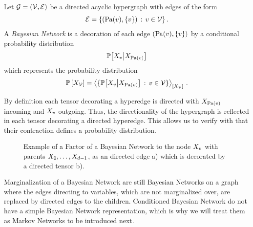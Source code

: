 \begin{definition}
    \label{def:bayesianNetwork}
    Let $\mathcal{G}=(\mathcal{V},\mathcal{E})$ be a directed acyclic hypergraph with edges of the form
    \[ \mathcal{E} = \{(\mathrm{Pa}(v),\{v\}) \,:\, v\in\mathcal{V}\} \, . \]
    A \emph{Bayesian Network} is a decoration of each edge $(\mathrm{Pa}(v),\{v\})$ by a conditional probability distribution
    \[ \mathbb{P}\big[X_{v}\big|X_{\mathrm{Pa}(v)}\big] \]
    which represents the probability distribution
    \begin{align*}
        \mathbb{P}\left[X_{\mathcal{V}}\right] = \left\langle \{\mathbb{P}\big[X_{v}\big|X_{\mathrm{Pa}(v)}\big] \,:\,v\in\mathcal{V}\}\right\rangle_{\left[ X_{\mathcal{V}} \right]} \, .
    \end{align*}
\end{definition}

By definition each tensor decorating a hyperedge is directed with $X_{\mathrm{Pa}(v)}$ incoming and $X_{v}$ outgoing.
Thus, the directionality of the hypergraph is reflected in each tensor decorating a directed hyperedge.
This allows us to verify with  that their contraction defines a probability distribution.


\begin{figure}[t]
    \begin{center}
        
    \end{center}
    \caption{Example of a Factor of a Bayesian Network to the node $X_{v}$ with parents $X_{0},\ldots,X_{d-1}$, as an directed edge a) which is decorated by a directed tensor b).}
    \label{fig:BayesianFactor}
\end{figure}


Marginalization of a Bayesian Network are still Bayesian Networks on a graph where the edges directing to variables, which are not marginalized over, are replaced by directed edges to the children.
Conditioned Bayesian Network do not have a simple Bayesian Network representation, which is why we will treat them as Markov Networks to be introduced next.


